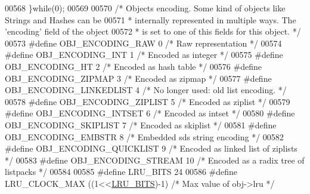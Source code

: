 \begin{DoxyCode}
{{{{{{00568 \textcolor{preprocessor}{\}}\textcolor{keywordflow}{while}\textcolor{preprocessor}{(}0\textcolor{preprocessor}{)}\textcolor{preprocessor}{;}
00569 
00570 \textcolor{comment}{/* Objects encoding. Some kind of objects like Strings and Hashes can be}
00571 \textcolor{comment}{ * internally represented in multiple ways. The 'encoding' field of the object}
00572 \textcolor{comment}{ * is set to one of this fields for this object. */}
00573 \textcolor{preprocessor}{#}\textcolor{preprocessor}{define} \textcolor{preprocessor}{OBJ\_ENCODING\_RAW} 0     \textcolor{comment}{/* Raw representation */}
00574 \textcolor{preprocessor}{#}\textcolor{preprocessor}{define} \textcolor{preprocessor}{OBJ\_ENCODING\_INT} 1     \textcolor{comment}{/* Encoded as integer */}
00575 \textcolor{preprocessor}{#}\textcolor{preprocessor}{define} \textcolor{preprocessor}{OBJ\_ENCODING\_HT} 2      \textcolor{comment}{/* Encoded as hash table */}
00576 \textcolor{preprocessor}{#}\textcolor{preprocessor}{define} \textcolor{preprocessor}{OBJ\_ENCODING\_ZIPMAP} 3  \textcolor{comment}{/* Encoded as zipmap */}
00577 \textcolor{preprocessor}{#}\textcolor{preprocessor}{define} \textcolor{preprocessor}{OBJ\_ENCODING\_LINKEDLIST} 4 \textcolor{comment}{/* No longer used: old list encoding. */}
00578 \textcolor{preprocessor}{#}\textcolor{preprocessor}{define} \textcolor{preprocessor}{OBJ\_ENCODING\_ZIPLIST} 5 \textcolor{comment}{/* Encoded as ziplist */}
00579 \textcolor{preprocessor}{#}\textcolor{preprocessor}{define} \textcolor{preprocessor}{OBJ\_ENCODING\_INTSET} 6  \textcolor{comment}{/* Encoded as intset */}
00580 \textcolor{preprocessor}{#}\textcolor{preprocessor}{define} \textcolor{preprocessor}{OBJ\_ENCODING\_SKIPLIST} 7  \textcolor{comment}{/* Encoded as skiplist */}
00581 \textcolor{preprocessor}{#}\textcolor{preprocessor}{define} \textcolor{preprocessor}{OBJ\_ENCODING\_EMBSTR} 8  \textcolor{comment}{/* Embedded sds string encoding */}
00582 \textcolor{preprocessor}{#}\textcolor{preprocessor}{define} \textcolor{preprocessor}{OBJ\_ENCODING\_QUICKLIST} 9 \textcolor{comment}{/* Encoded as linked list of ziplists */}
00583 \textcolor{preprocessor}{#}\textcolor{preprocessor}{define} \textcolor{preprocessor}{OBJ\_ENCODING\_STREAM} 10 \textcolor{comment}{/* Encoded as a radix tree of listpacks */}
00584 
00585 \textcolor{preprocessor}{#}\textcolor{preprocessor}{define} \textcolor{preprocessor}{LRU\_BITS} 24
00586 \textcolor{preprocessor}{#}\textcolor{preprocessor}{define} \textcolor{preprocessor}{LRU\_CLOCK\_MAX} \textcolor{preprocessor}{(}\textcolor{preprocessor}{(}1\textcolor{preprocessor}{<<}\hyperlink{server_8h_ae839804d2b5fd0b2a83eb05e820079f3}{LRU\_BITS}\textcolor{preprocessor}{)}\textcolor{preprocessor}{-}1\textcolor{preprocessor}{)} \textcolor{comment}{/* Max value of obj->lru */}
}}}}}}
\end{DoxyCode}
